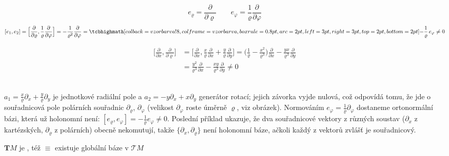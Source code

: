 \begin{priklad}
\[
  e_\varrho = \frac{\partial}{\partial\varrho} \qquad e_\varphi = \frac{1}{\varrho}\frac{\partial}{\partial\varphi}
\]
\[
  [e_1,e_2] = \Big[\frac{\partial}{\partial\varrho}, \frac{1}{\varrho}\frac{\partial}{\partial\varphi}\Big] = -\frac{1}{\varrho^2}\frac{\partial}{\partial\varphi} = \vzorec{-\frac{1}{\varrho}\,e_\varphi \neq 0}
\]
\end{priklad}

\begin{priklad}[Př]
\begin{align*}
  \Big[\frac{\partial}{\partial x}, \frac{\partial}{\partial\varrho}\Big]
  &= \Big[\frac{\partial}{\partial x}, \frac{x}{\varrho}\frac{\partial}{\partial x} + \frac{y}{\varrho}\frac{\partial}{\partial y}\Big]
   = \Big(\frac{1}{\varrho} - \frac{x^2}{\varrho^3}\Big)\frac{\partial}{\partial x} - \frac{yx}{\varrho^3}\frac{\partial}{\partial y} \\
  &= \frac{y^2}{\varrho^3}\frac{\partial}{\partial x} - \frac{xy}{\varrho^3}\frac{\partial}{\partial y} \neq 0
\end{align*}
 \ 
\end{priklad}

\begin{vysvetleni}[K příkladům]
$a_1=\frac{x}{\varrho}\partial_x+\frac{y}{\varrho}\partial_y$ je jednotkové radiální pole a $a_2=-y\partial_x+x\partial_y$ generátor rotací; jejich závorka vyjde nulová, což odpovídá tomu, že jde o souřadnicová pole polárních souřadnic $\partial_\varrho$, $\partial_\varphi$ (velikost $\partial_\varphi$ roste úměrně $\varrho$, viz obrázek). Normováním $e_\varphi=\frac{1}{\varrho}\partial_\varphi$ dostaneme ortonormální bázi, která už holonomní není: $[e_\varrho,e_\varphi]=-\frac{1}{\varrho}e_\varphi\neq0$. Poslední příklad ukazuje, že dva souřadnicové vektory z různých soustav ($\partial_x$ z kartézských, $\partial_\varrho$ z polárních) obecně nekomutují, takže $\{\partial_x,\partial_\varrho\}$ není holonomní báze, ačkoli každý z vektorů zvlášť je souřadnicový.
\end{vysvetleni}

\begin{definice}
$\mathbf{T}M$ je , též  $\equiv$ existuje globální báze v $\mathcal{T}M$
\end{definice}

